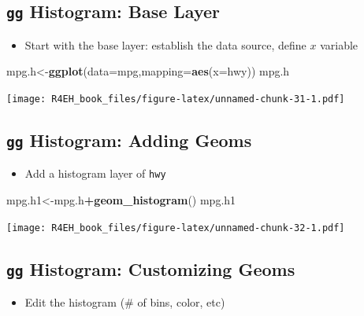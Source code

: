 \documentclass[]{book}
\newenvironment{Shaded}{\begin{snugshade}}{\end{snugshade}}
\newcommand{\KeywordTok}[1]{\textcolor[rgb]{0.13,0.29,0.53}{\textbf{#1}}}
\newcommand{\DataTypeTok}[1]{\textcolor[rgb]{0.13,0.29,0.53}{#1}}
\newcommand{\OperatorTok}[1]{\textcolor[rgb]{0.81,0.36,0.00}{\textbf{#1}}}
\newcommand{\NormalTok}[1]{#1}
\providecommand{\tightlist}{%
  \setlength{\itemsep}{0pt}\setlength{\parskip}{0pt}}
\theoremstyle{definition}
\theoremstyle{definition}
\theoremstyle{definition}
\theoremstyle{remark}
\begin{document}
\subsection{\texorpdfstring{\texttt{gg} Histogram: Base
Layer}{gg Histogram: Base Layer}}\label{gg-histogram-base-layer}

\begin{itemize}
\tightlist
\item
  Start with the base layer: establish the data source, define \(x\)
  variable
\end{itemize}

\begin{Shaded}
\begin{Highlighting}[]
\NormalTok{mpg.h<-}\KeywordTok{ggplot}\NormalTok{(}\DataTypeTok{data=}\NormalTok{mpg,}\DataTypeTok{mapping=}\KeywordTok{aes}\NormalTok{(}\DataTypeTok{x=}\NormalTok{hwy))}
\NormalTok{mpg.h}
\end{Highlighting}
\end{Shaded}

\texttt{[image: R4EH\_book\_files/figure-latex/unnamed-chunk-31-1.pdf]}

\subsection{\texorpdfstring{\texttt{gg} Histogram: Adding
Geoms}{gg Histogram: Adding Geoms}}\label{gg-histogram-adding-geoms}

\begin{itemize}
\tightlist
\item
  Add a histogram layer of \texttt{hwy}
\end{itemize}

\begin{Shaded}
\begin{Highlighting}[]
\NormalTok{mpg.h1<-mpg.h}\OperatorTok{+}\KeywordTok{geom_histogram}\NormalTok{()}
\NormalTok{mpg.h1}
\end{Highlighting}
\end{Shaded}

\texttt{[image: R4EH\_book\_files/figure-latex/unnamed-chunk-32-1.pdf]}

\subsection{\texorpdfstring{\texttt{gg} Histogram: Customizing
Geoms}{gg Histogram: Customizing Geoms}}\label{gg-histogram-customizing-geoms}

\begin{itemize}
\tightlist
\item
  Edit the histogram (\# of bins, color, etc)
\end{itemize}
\end{document}
